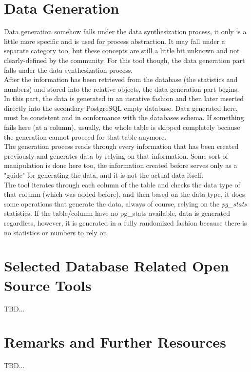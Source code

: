 \section{Data Generation}
Data generation somehow falls under the data synthesization process, it only is a little more specific and is used for process abstraction. It may fall under a separate category too, but these concepts are still a little bit unknown and not clearly-defined by the community. For this tool though, the data generation part falls under the data synthesization process.\\
\newline
After the information has been retrieved from the database (the statistics and numbers) and stored into the relative objects, the data generation part begins.\\
In this part, the data is generated in an iterative fashion and then later inserted directly into the secondary PostgreSQL empty database. Data generated here, must be consistent and in conformance with the databases schema. If something fails here (at a column), usually, the whole table is skipped completely because the generation cannot proceed for that table anymore.\\
The generation process reads through every information that has been created previously and generates data by relying on that information. Some sort of manipulation is done here too, the information created before serves only as a "guide" for generating the data, and it is not the actual data itself.\\
The tool iterates through each column of the table and checks the data type of that column (which was added before), and then based on the data type, it does some operations that generate the data, always of course, relying on the \textit{pg\_stats} statistics. If the table/column have no pg\_stats available, data is generated regardless, however, it is generated in a fully randomized fashion because there is no statistics or numbers to rely on.
\section{Selected Database Related Open Source Tools}
TBD...
\section{Remarks and Further Resources}
TBD...